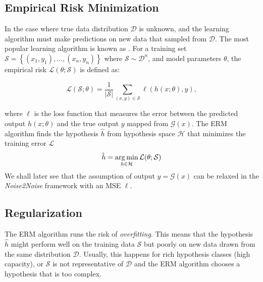 \subsection{Empirical Risk Minimization}

In the case where true data distribution $\mathcal{D}$ is unknown, and the learning algorithm must make predictions on new data that sampled from $\mathcal{D}$.
The most popular learning algorithm is known as \textit{}. For a training set $\mathcal{S} = \left\{ (x_1, y_1), \ldots, (x_n, y_n) \right\}$ where $\mathcal{S} \sim \mathcal{D}^n$, and model parameters $\theta$, the empirical risk $\mathcal{L}(\theta; \mathcal{S})$ is defined as:

\begin{equation}
    \mathcal{L}(\mathcal{S}; \theta) = \frac{1}{\lvert \mathcal{S} \rvert} \sum_{(x, y) \in \mathcal{S}} \ell(h(x; \theta), y),
\end{equation}

where $\ell$ is the loss function that measures the error between the predicted output $h(x; \theta)$ and the true output $y$ mapped from $\mathcal{G} (x)$. The \gls{ERM} algorithm finds the hypothesis $\hat{h}$ from hypothesis space $\mathcal{H}$ that minimizes the training error $\mathcal{L}$
\begin{equation}
    \hat{h} = \operatorname*{arg\,min}_{h \in \mathcal{H}} \mathcal{L}(\theta; \mathcal{S})
\end{equation}
We shall later see that the assumption of output  $y = \mathcal{G} (x)$ can be relaxed in the \textit{Noise2Noise} framework with an \gls{MSE} $\ell$.

\subsection{Regularization}
The \gls{ERM} algorithm runs the risk of \textit{overfitting}. This means that the hypothesis $\hat{h}$ might perform well on the training data $\mathcal{S}$ but poorly on new data drawn from the same distribution $\mathcal{D}$. Usually, this happens for rich hypothesis classes (high capacity), or $\mathcal{S}$ is not representative of $\mathcal{D}$ and the \gls{ERM} algorithm chooses a hypothesis that is too complex. 

